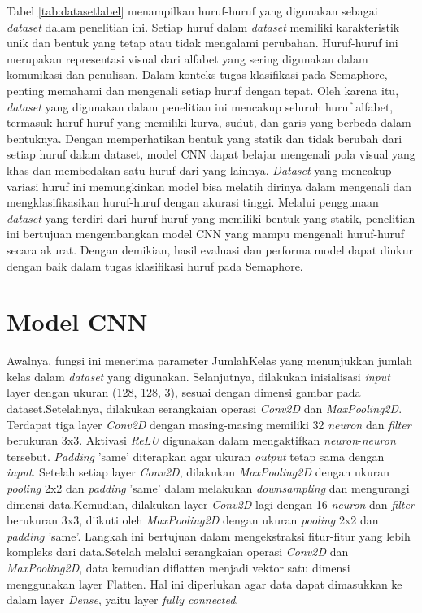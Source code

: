 Tabel \ref{tab:datasetlabel} menampilkan huruf-huruf yang digunakan sebagai \textit{dataset} dalam penelitian ini. Setiap huruf dalam \textit{dataset} memiliki karakteristik unik dan bentuk yang tetap atau tidak mengalami perubahan. Huruf-huruf ini merupakan representasi visual dari alfabet yang sering digunakan dalam komunikasi dan penulisan. Dalam konteks tugas klasifikasi pada Semaphore, penting memahami dan mengenali setiap huruf dengan tepat. Oleh karena itu, \textit{dataset} yang digunakan dalam penelitian ini mencakup seluruh huruf alfabet, termasuk huruf-huruf yang memiliki kurva, sudut, dan garis yang berbeda dalam bentuknya. Dengan memperhatikan bentuk yang statik dan tidak berubah dari setiap huruf dalam dataset, model CNN dapat belajar  mengenali pola visual yang khas dan membedakan satu huruf dari yang lainnya. \textit{Dataset} yang mencakup variasi huruf ini memungkinkan model bisa melatih dirinya dalam mengenali dan mengklasifikasikan huruf-huruf dengan akurasi tinggi. Melalui penggunaan \textit{dataset} yang terdiri dari huruf-huruf yang memiliki bentuk yang statik, penelitian ini bertujuan mengembangkan model CNN yang mampu mengenali huruf-huruf secara akurat. Dengan demikian, hasil evaluasi dan performa model dapat diukur dengan baik dalam tugas klasifikasi huruf pada Semaphore.

\section{Model CNN}
Awalnya, fungsi ini menerima parameter JumlahKelas yang menunjukkan jumlah kelas dalam \textit{dataset} yang digunakan. Selanjutnya, dilakukan inisialisasi \textit{input} layer dengan ukuran (128, 128, 3), sesuai dengan dimensi gambar pada dataset.Setelahnya, dilakukan serangkaian operasi \textit{Conv2D} dan \textit{MaxPooling2D}. Terdapat tiga layer \textit{Conv2D} dengan masing-masing memiliki 32 \textit{neuron} dan \textit{filter} berukuran 3x3. Aktivasi \textit{ReLU} digunakan dalam mengaktifkan \textit{neuron}-\textit{neuron} tersebut. \textit{Padding} 'same' diterapkan agar ukuran \textit{output} tetap sama dengan \textit{input}. Setelah setiap layer \textit{Conv2D}, dilakukan \textit{MaxPooling2D} dengan ukuran \textit{pooling} 2x2 dan \textit{padding} 'same' dalam melakukan \textit{downsampling} dan mengurangi dimensi data.Kemudian, dilakukan layer \textit{Conv2D} lagi dengan 16 \textit{neuron} dan \textit{filter} berukuran 3x3, diikuti oleh \textit{MaxPooling2D} dengan ukuran \textit{pooling} 2x2 dan \textit{padding} 'same'. Langkah ini bertujuan dalam mengekstraksi fitur-fitur yang lebih kompleks dari data.Setelah melalui serangkaian operasi \textit{Conv2D} dan \textit{MaxPooling2D}, data kemudian diflatten menjadi vektor satu dimensi menggunakan layer Flatten. Hal ini diperlukan agar data dapat dimasukkan ke dalam layer \textit{Dense}, yaitu layer \textit{fully connected}.

